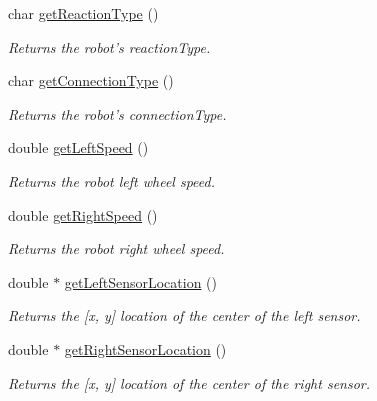 \begin{DoxyCompactItemize}
char \hyperlink{classRobotClass_a5264f716f6c216607f542cc7a2e08930}{get\-Reaction\-Type} ()
\begin{DoxyCompactList}\small\item\em Returns the robot's reaction\-Type. \end{DoxyCompactList}\item 
char \hyperlink{classRobotClass_acbf804af7a4ea02417df0aeddae5704c}{get\-Connection\-Type} ()
\begin{DoxyCompactList}\small\item\em Returns the robot's connection\-Type. \end{DoxyCompactList}\item 
double \hyperlink{classRobotClass_aa37142a222c6b2fc1f877d395f0b371d}{get\-Left\-Speed} ()
\begin{DoxyCompactList}\small\item\em Returns the robot left wheel speed. \end{DoxyCompactList}\item 
double \hyperlink{classRobotClass_ab414f4d538c9ba99c32c0297ac8ca189}{get\-Right\-Speed} ()
\begin{DoxyCompactList}\small\item\em Returns the robot right wheel speed. \end{DoxyCompactList}\item 
double $\ast$ \hyperlink{classRobotClass_a3a0e78ec4676acd3967102e56877dbd2}{get\-Left\-Sensor\-Location} ()
\begin{DoxyCompactList}\small\item\em Returns the \mbox{[}x, y\mbox{]} location of the center of the left sensor. \end{DoxyCompactList}\item 
double $\ast$ \hyperlink{classRobotClass_a285cf391b3d61dcc7428bd3fa09062e2}{get\-Right\-Sensor\-Location} ()
\begin{DoxyCompactList}\small\item\em Returns the \mbox{[}x, y\mbox{]} location of the center of the right sensor. \end{DoxyCompactList}\end{DoxyCompactItemize}
